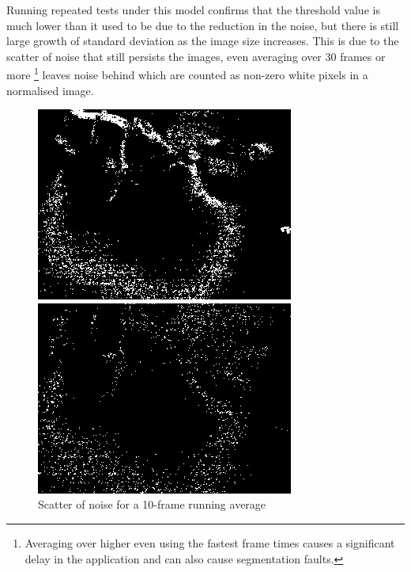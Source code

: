 \documentclass[11pt]{article} %
\begin{document}
{{Running repeated tests under this model confirms that the threshold value is much lower than it used to be due to the reduction in the noise, but there is still large growth of standard deviation as the image size increases. This is due to the scatter of noise that still persists the images, even averaging over 30 frames or more \footnote{Averaging over higher even using the fastest frame times causes a significant delay in the application and can also cause segmentation faults.}
leaves noise behind which are counted as non-zero white pixels in a normalised image.

\begin{figure}[H]
\begin{minipage}{0.4\textwidth}
\centering
\includegraphics[width=\textwidth]{../images/scatter1}\caption{Scatter of noise for a 1-frame running average}\label{img:scatter1}
\end{minipage}
\hspace{30pt}
\begin{minipage}{0.4\textwidth}
\centering
\includegraphics[width=\textwidth]{../images/scatter2}\caption{Scatter of noise for a 10-frame running average}\label{img:scatter2}
\end{minipage}
\end{figure}

}}
\end{document}
